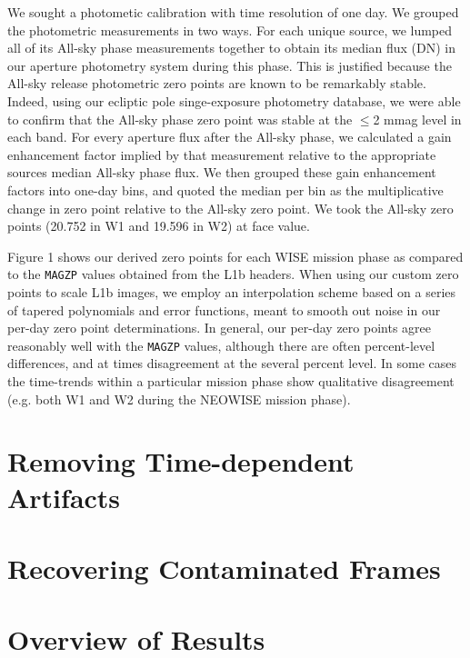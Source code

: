\documentclass{emulateapj}
\begin{document}
We sought a photometic calibration with time resolution of one day. We
grouped the photometric measurements in two ways. For each unique source,
we lumped all of its All-sky phase measurements together to obtain its median
flux (DN) in our aperture photometry system during this phase. This is
justified because the All-sky release photometric zero points are known
to be remarkably stable. Indeed, using our ecliptic pole singe-exposure 
photometry database, we were able to confirm that the All-sky phase zero point 
was stable at the $\le$2 mmag level in each band. For every aperture
flux after the All-sky phase, we calculated a gain enhancement factor
implied by that measurement relative to the appropriate sources
median All-sky phase flux. We then grouped these gain enhancement factors
into one-day bins, and quoted the median per bin as the multiplicative
change in zero point relative to the All-sky zero point. We took the 
All-sky zero points (20.752 in W1 and 19.596 in W2) at face value.

Figure 1 shows our derived zero points for each WISE mission phase as 
compared to the \verb|MAGZP| values obtained from the L1b headers. When
using our custom zero points to scale L1b images, we employ an 
interpolation scheme based on a series of tapered polynomials and 
error functions, meant to smooth out noise in our per-day zero point
determinations. In general, our per-day zero points agree reasonably
well with the \verb|MAGZP| values, although there are often 
percent-level differences, and at times disagreement at the several percent
level. In some cases the time-trends within a particular mission phase
show qualitative disagreement (e.g. both W1 and W2 during the NEOWISE
mission phase).



\section{Removing Time-dependent Artifacts}
\label{sec:moon}

\section{Recovering Contaminated Frames}
\label{sec:recover}

\section{Overview of Results}
\label{sec:results}
\end{document}
